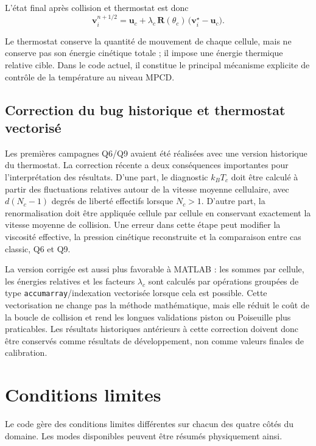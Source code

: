 \documentclass[11pt,a4paper]{article}
\begin{document}
L'état final après collision et thermostat est donc
\begin{equation}
 \bm{v}_i^{n+1/2} = \bm{u}_c + \lambda_c\,\mathbf{R}(\theta_c)\,\bigl(\bm{v}_i^{\star}-\bm{u}_c\bigr).
\end{equation}

Le thermostat conserve la quantité de mouvement de chaque cellule, mais ne conserve pas son énergie cinétique totale ; il impose une énergie thermique relative cible. Dans le code actuel, il constitue le principal mécanisme explicite de contrôle de la température au niveau MPCD.


\subsection{Correction du bug historique et thermostat vectorisé}

Les premières campagnes Q6/Q9 avaient été réalisées avec une version historique du thermostat. La correction récente a deux conséquences importantes pour l'interprétation des résultats. D'une part, le diagnostic \(k_BT_c\) doit être calculé à partir des fluctuations relatives autour de la vitesse moyenne cellulaire, avec \(d(N_c-1)\) degrés de liberté effectifs lorsque \(N_c>1\). D'autre part, la renormalisation doit être appliquée cellule par cellule en conservant exactement la vitesse moyenne de collision. Une erreur dans cette étape peut modifier la viscosité effective, la pression cinétique reconstruite et la comparaison entre cas classic, Q6 et Q9.

La version corrigée est aussi plus favorable à MATLAB : les sommes par cellule, les énergies relatives et les facteurs \(\lambda_c\) sont calculés par opérations groupées de type \texttt{accumarray}/indexation vectorisée lorsque cela est possible. Cette vectorisation ne change pas la méthode mathématique, mais elle réduit le coût de la boucle de collision et rend les longues validations piston ou Poiseuille plus praticables. Les résultats historiques antérieurs à cette correction doivent donc être conservés comme résultats de développement, non comme valeurs finales de calibration.

\section{Conditions limites}

Le code gère des conditions limites différentes sur chacun des quatre côtés du domaine. Les modes disponibles peuvent être résumés physiquement ainsi.
\end{document}
